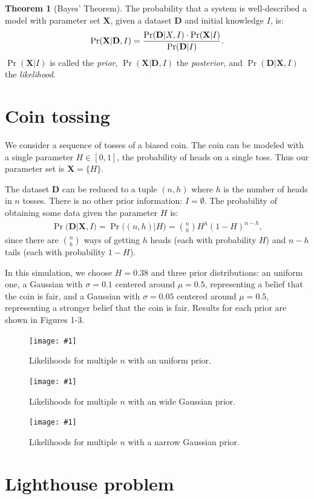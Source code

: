 \documentclass{article}
\renewcommand{\vec}{\mathbf}
\theoremstyle{definition}
\newtheorem*{thm}{Theorem}
\newcommand{\plop}[2]{
    \begin{figure}\centering
        \texttt{[image: \#1]}
        \caption{\label{#1}#2}
    \end{figure}
}
\begin{document}
\begin{thm}[Bayes' Theorem]
The probability that a system is well-described a model with
parameter set $\vec X$, given a dataset $\vec D$ and initial knowledge
$I$, is:
\begin{align*}
\Pr(\vec X | \vec D, I) =
{
    \Pr(\vec D | X, I) \cdot \Pr(\vec X | I)
    \over
    \Pr(\vec D | I)
}.
\end{align*}
$\Pr(\vec X | I)$ is called the \emph{prior}, $\Pr(\vec X | \vec D, I)$
the \emph{posterior}, and $\Pr(\vec D | \vec X, I)$ the \emph{likelihood}.
\end{thm}

\section{Coin tossing}

We consider a sequence of tosses of a biased coin. The coin can be
modeled with a single parameter $H \in [0, 1]$, the probability of
heads on a single toss. Thus our parameter set is $\vec X = \{ H \}$.

The dataset $\vec D$ can be reduced to a tuple $(n, h)$ where $h$
is the number of heads in $n$ tosses. There is no other
prior information: $I = \emptyset$. The probability of obtaining
some data given the parameter $H$ is:
\begin{align*}
\Pr(\vec D | \vec X, I) = \Pr\Big( (n, h) | H \Big)
= {n \choose h} H^h (1 - H)^{n - h},
\end{align*}
since there are ${n \choose h}$ ways of getting $h$ heads (each
with probability $H$) and $n - h$ tails (each with probability
$1 - H$).

In this simulation, we choose $H = 0.38$ and three prior distributions:
an uniform one, a Gaussian with $\sigma = 0.1$ centered around $\mu = 0.5$,
representing a belief that the coin is fair, and a Gaussian
with $\sigma = 0.05$ centered around $\mu = 0.5$, representing a stronger
belief that the coin is fair. Results for each prior are shown
in Figures 1-3.

\plop{coin_uniform.pdf}{Likelihoods for multiple $n$ with an
uniform prior.}
\plop{coin_widegauss.pdf}{Likelihoods for multiple $n$ with an
wide Gaussian prior.}
\plop{coin_narrowgauss.pdf}{Likelihoods for multiple $n$ with
a narrow Gaussian prior.}

\section{Lighthouse problem}
\end{document}
